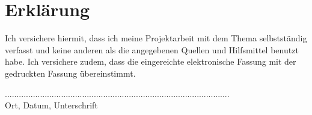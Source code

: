 \section*{Erklärung}
Ich versichere hiermit, dass ich meine Projektarbeit mit
dem Thema 
\textbf{\thetitle} selbstständig verfasst und keine anderen als die
angegebenen Quellen und Hilfsmittel benutzt habe.
Ich versichere zudem, dass die eingereichte elektronische Fassung mit der gedruckten Fassung übereinstimmt.

\vspace{3cm}
................................................................................................\\
Ort, Datum, Unterschrift

